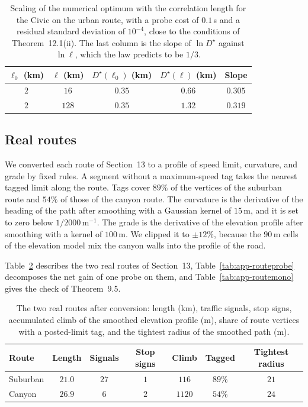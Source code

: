 \documentclass[12pt, twoside]{amsart}
\theoremstyle{definition}
\newcommand{\mainref}[2]{#2}
\begin{document}
\begin{table}[htbp]
\centering\small
\caption{Scaling of the numerical optimum with the correlation length for the Civic on the urban route, with a probe cost of $0.1$\,s and a residual standard deviation of $10^{-4}$, close to the conditions of Theorem~\mainref{thm:spacing}{12.1}\mainref{sp:law}{{(ii)}}. The last column is the slope of $\ln D^\star$ against $\ln\ell$, which the law predicts to be $1/3$.}\label{tab:app-scaling}
\begin{tabular}{ccccc}
\toprule
$\ell_0$ (km) & $\ell$ (km) & $D^\star(\ell_0)$ (km) & $D^\star(\ell)$ (km) & Slope\\
\midrule
$2$ & $16$ & $0.35$ & $0.66$ & $0.305$\\
$2$ & $128$ & $0.35$ & $1.32$ & $0.319$\\
\bottomrule
\end{tabular}
\end{table}
\FloatBarrier

\subsection{Real routes}\label{supp:routes}

We converted each route of Section~\mainref{sec:realroutes}{13} to a profile of speed limit,
curvature, and grade by fixed rules. A segment without a maximum-speed tag takes the nearest tagged
limit along the route. Tags cover $89\%$ of the vertices of the suburban route and $54\%$ of those of
the canyon route. The curvature is the derivative of the heading of the path after smoothing with a
Gaussian kernel of $15$\,m, and it is set to zero below $1/2000$\,m$^{-1}$. The grade is the
derivative of the elevation profile after smoothing with a kernel of $100$\,m. We clipped it to
$\pm12\%$, because the $90$\,m cells of the elevation model mix the canyon walls into the profile of
the road.

Table~\ref{tab:app-routes} describes the two real routes of Section~\mainref{sec:realroutes}{13},
Table~\ref{tab:app-routeprobe} decomposes the net gain of one probe on them, and
Table~\ref{tab:app-routemono} gives the check of Theorem~\mainref{thm:transit}{9.5}.

\begin{table}[htbp]
\centering\small
\caption{The two real routes after conversion: length (km), traffic signals, stop signs, accumulated climb of the smoothed elevation profile (m), share of route vertices with a posted-limit tag, and the tightest radius of the smoothed path (m).}\label{tab:app-routes}
\begin{tabular}{lcccccc}
\toprule
Route & Length & Signals & Stop signs & Climb & Tagged & Tightest radius\\
\midrule
Suburban & $21.0$ & $27$ & $1$ & $116$ & $89\%$ & $21$\\
Canyon & $26.9$ & $6$ & $2$ & $1120$ & $54\%$ & $24$\\
\bottomrule
\end{tabular}
\end{table}
\end{document}
